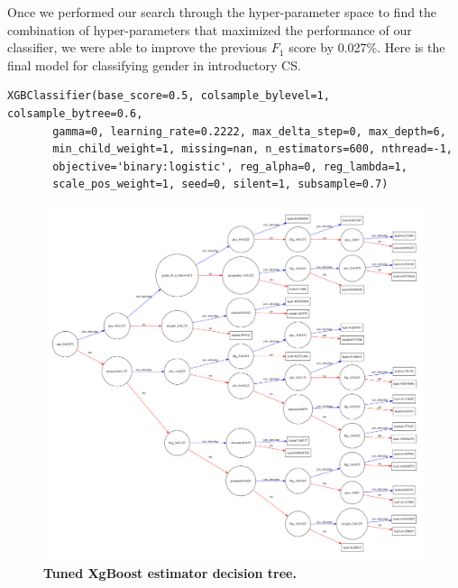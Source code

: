 Once we performed our search through the hyper-parameter space to find the combination of hyper-parameters that maximized the performance of our classifier, we were able to improve the previous $F_1$ score by 0.027\%. Here is the final model for classifying gender in introductory CS. 
\begin{verbatim}
XGBClassifier(base_score=0.5, colsample_bylevel=1, colsample_bytree=0.6,
       gamma=0, learning_rate=0.2222, max_delta_step=0, max_depth=6,
       min_child_weight=1, missing=nan, n_estimators=600, nthread=-1,
       objective='binary:logistic', reg_alpha=0, reg_lambda=1,
       scale_pos_weight=1, seed=0, silent=1, subsample=0.7)
\end{verbatim}

\begin{figure}[!hbtp]
\centering
    \includegraphics[width=1\textwidth]{figures/Tuned_model_graph}
    \caption{\textbf{Tuned XgBoost estimator decision tree. }\textit{}}\label{tuned_plot_tree}
\end{figure}

